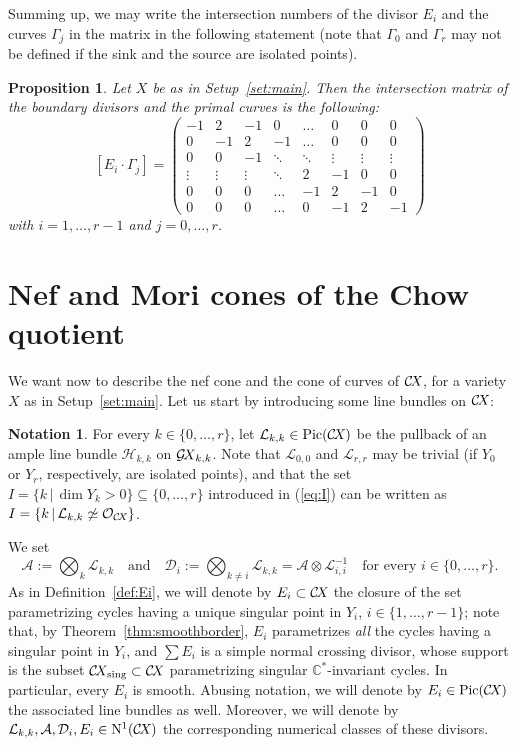 \documentclass[10pt,a4paper]{article}
\numberwithin{equation}{section}
\newtheorem{proposition}[theorem]{Proposition}
\theoremstyle{definition}
\newtheorem{notation}[theorem]{Notation}
\theoremstyle{remark}
\def\sing{\operatorname{sing}}
\def\C{{\mathbb C}}
\def\cA{{\mathcal A}}
\def\cD{{\mathcal D}}
\def\cH{{\mathcal{H}}}
\def\cL{{\mathcal L}}
\def\cO{{\mathcal{O}}}
\def\operatorname#1{\mathop{\rm #1}\nolimits}
\def\Pic{\operatorname{Pic}}
\def\NU{{\operatorname{N^1}}}
\def\GX{\mathcal{G}\!X\hspace{-0.5pt}}
\def\CX{\mathcal{C}\!X\hspace{-0.5pt}}
\begin{document}
Summing up, we may write the intersection numbers of the divisor $E_i$ and the curves $\Gamma_j$ in the matrix in the following statement (note that $\Gamma_0$ and $\Gamma_r$ may not be defined if the sink and the source are isolated points). 

\begin{proposition}\label{prop:intnumbers}
Let $X$ be as in Setup~\ref{set:main}.  Then the  intersection matrix of the boundary divisors and the primal curves 
is the following:
\[
[E_i \cdot \Gamma_j]=
\begin{pmatrix}-1&2&-1&0&\dots&0&0&0\\
0&-1&2&-1&\dots&0&0&0\\
0&0&-1&\ddots&\ddots&\vdots&\vdots&\vdots\\
\vdots&\vdots&\vdots&\ddots&2&-1&0&0\\
0&0&0&\dots&-1&2&-1&0\\
0&0&0&\dots&0&-1&2&-1\end{pmatrix}
\]
with $i=1,\dots, r-1$ and $j = 0,\dots,r$.
\end{proposition}

\section{Nef and Mori cones of the Chow quotient}\label{sec:nefmori}

We want now to describe the nef cone and the cone of curves of $\CX$, for a variety $X$ as in Setup~\ref{set:main}.
Let us start by introducing some line bundles on $\CX$:
\begin{notation}\label{not:divisors}
For every $k\in \{0,\dots,r\}$, let $\cL_{k,k} \in \Pic(\CX)$ be the pullback of an ample line bundle $\cH_{k,k}$ on $\GX_{k,k}$. 
Note that $\cL_{0,0}$ and $\cL_{r,r}$ may be trivial (if $Y_0$ or $Y_r$, respectively, are isolated points), and that the set $I=\{k\,|\, \dim Y_k >0\}\subseteq \{0,\dots, r\}$ introduced in (\ref{eq:I}) can be written as $I =\{k\,|\, \cL_{k,k}\not\simeq \cO_{\CX}\}$.

We set
\[
\cA:=\bigotimes_{k} \cL_{k,k}\quad\mbox{and}\quad \cD_i:=\bigotimes_{k \not =i} \cL_{k,k}=\cA\otimes\cL_{i,i}^{-1} \quad\mbox{for every $i\in \{0,\dots,r\}.$}\]
As in Definition~\ref{def:Ei}, we will denote by $E_i\subset\CX$ the closure of the set parametrizing cycles having a unique singular point in $Y_i$, $i\in \{1,\dots,r-1\}$; note that, by  Theorem~\ref{thm:smoothborder},  $E_i$ parametrizes {\em all} the cycles having a singular point in $Y_i$, and  $\sum E_i$ is a simple normal crossing divisor, whose support is the subset $\CX_{\sing}\subset \CX$ parametrizing singular $\C^*$-invariant cycles. In particular, every $E_i$ is smooth. Abusing notation, we will denote by $E_i\in \Pic(\CX)$  the associated line bundles as well. Moreover, we will denote by $\cL_{k,k},\cA,\cD_{i},E_i\in \NU(\CX)$ the corresponding numerical classes of these divisors. 
\end{notation}
\end{document}
